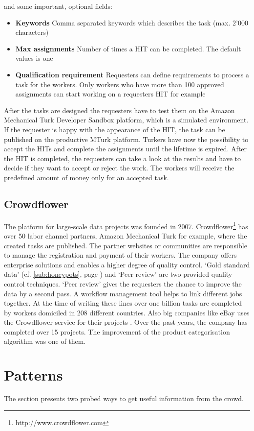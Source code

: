 and some important, optional fields: 
\begin{itemize}
	\item \textbf{Keywords} Comma separated keywords which describes the task (max. 2'000 characters) 
	\item \textbf{Max assignments} Number of times a HIT can be completed. The default values is one 
	\item \textbf{Qualification requirement} Requesters can define requirements to process a task for the workers. Only workers who have more than 100 approved assignments can start working on a requesters HIT for example 
\end{itemize}
After the tasks are designed the requesters have to test them on the Amazon Mechanical Turk Developer Sandbox platform, which is a simulated environment. If the requester is happy with the appearance of the HIT, the task can be published on the productive MTurk platform. Turkers have now the possibility to accept the HITs and complete the assignments until the lifetime is expired. After the HIT is completed, the requesters can take a look at the results and have to decide if they want to accept or reject the work. The workers will receive the predefined amount of money only for an accepted task. 

\subsection{Crowdflower}
The platform for large-scale data projects was founded in 2007. Crowdflower\footnote{http://www.crowdflower.com} has over 50 labor channel partners, Amazon Mechanical Turk for example, where the created tasks are published. The partner websites or communities are responsible to manage the registration and payment of their workers. The company offers enterprise solutions and enables a higher degree of quality control. `Gold standard data' (cf. \ref{sub:honeypots}, page \pageref{sub:honeypots}) and `Peer review' are two provided quality control techniques. `Peer review' gives the requesters the chance to improve the data by a second pass. A workflow management tool helps to link different jobs together. At the time of writing these lines over one billion tasks are completed by workers domiciled in 208 different countries. Also big companies like eBay uses the Crowdflower service for their projects \cite{crowdflower_casestudy}. Over the past years, the company has completed over 15 projects. The improvement of the product categorisation algorithm was one of them.
\section{Patterns}
The section presents two probed ways to get useful information from the crowd.
